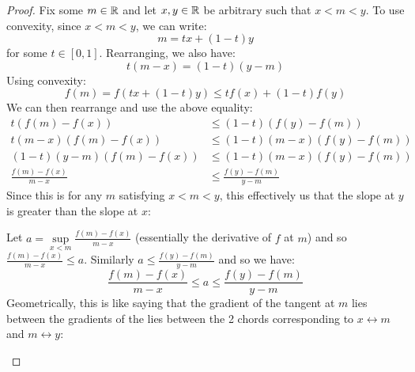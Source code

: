 \documentclass[../main.tex]{subfiles}
\begin{document}
\begin{proof}
  Fix some $m \in \mathbb{R}$ and let $x, y \in \mathbb{R}$ be arbitrary such that $x < m < y$.
  To use convexity, since $x < m < y$, we can write:
  \[
    m = tx + (1 - t)y
  \]
  for some $t \in [0, 1]$.
  Rearranging, we also have:
  \[
    t(m - x) = (1 - t)(y - m)
  \]
  Using convexity:
  \[
    f(m) = f(tx + (1 - t)y) \leq tf(x) + (1 - t)f(y)
  \]
  We can then rearrange and use the above equality:
  \begin{align*}
    t(f(m) - f(x)) &\leq (1 - t)(f(y) - f(m)) \\
    t(m - x)(f(m) - f(x)) &\leq (1 - t)(m - x)(f(y) - f(m)) \\
    (1 - t)(y - m)(f(m) - f(x)) &\leq (1 - t)(m - x)(f(y) - f(m)) \\
    \frac{f(m) - f(x)}{m - x} &\leq \frac{f(y) - f(m)}{y- m}
  \end{align*}
  Since this is for any $m$ satisfying $x < m < y$, this effectively us that the slope at $y$ is greater than the slope at $x$:
  \begin{center}
  \end{center}
  Let $a = \sup\limits_{x < m}\frac{f(m) - f(x)}{m - x}$ (essentially the derivative of $f$ at $m$) and so $\frac{f(m) - f(x)}{m - x} \leq a$.
  Similarly $a \leq \frac{f(y) - f(m)}{y - m}$ and so we have:
  \[
    \frac{f(m) - f(x)}{m - x} \leq a \leq \frac{f(y) - f(m)}{y - m}
  \]
  Geometrically, this is like saying that the gradient of the tangent at $m$ lies between the gradients of the lies between the 2 chords corresponding to $x \leftrightarrow m$ and $m \leftrightarrow y$:
  \begin{center}
\end{center}
\end{proof}
\end{document}
